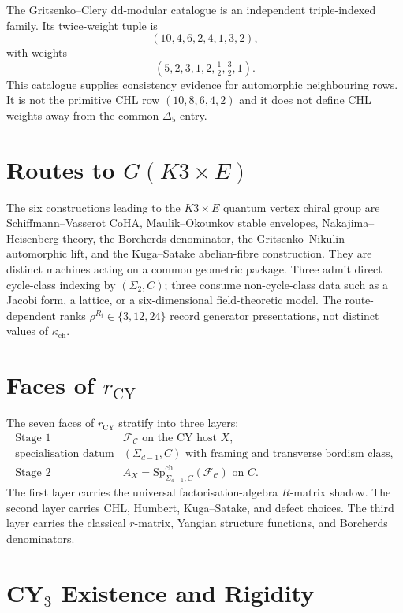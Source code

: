 \documentclass[11pt]{article}
\providecommand{\kch}{\kappa_{\mathrm{ch}}}
\providecommand{\cF}{\mathcal{F}}
\providecommand{\cC}{\mathcal{C}}
\theoremstyle{plain}
\theoremstyle{definition}
\theoremstyle{remark}
\begin{document}
The Gritsenko--Clery dd-modular catalogue is an independent
triple-indexed family.  Its twice-weight tuple is
\[
  (10,4,6,2,4,1,3,2),
\]
with weights
\[
  (5,2,3,1,2,\tfrac12,\tfrac32,1).
\]
This catalogue supplies consistency evidence for automorphic
neighbouring rows.  It is not the primitive CHL row
$(10,8,6,4,2)$ and it does not define CHL weights away from the
common $\Delta_5$ entry.

\section{Routes to \texorpdfstring{$G(K3\times E)$}{G(K3xE)}}

The six constructions leading to the $K3\times E$ quantum vertex
chiral group are Schiffmann--Vasserot CoHA, Maulik--Okounkov stable
envelopes, Nakajima--Heisenberg theory, the Borcherds denominator,
the Gritsenko--Nikulin automorphic lift, and the Kuga--Satake
abelian-fibre construction.  They are distinct machines acting on a
common geometric package.  Three admit direct cycle-class indexing by
$(\Sigma_2,C)$; three consume non-cycle-class data such as a Jacobi
form, a lattice, or a six-dimensional field-theoretic model.  The
route-dependent ranks $\rho^{R_i}\in\{3,12,24\}$ record generator
presentations, not distinct values of $\kch$.

\section{Faces of \texorpdfstring{$r_{\mathrm{CY}}$}{rCY}}

The seven faces of $r_{\mathrm{CY}}$ stratify into three layers:
\[
\begin{array}{ll}
\text{Stage 1} &
  \cF_{\cC}\text{ on the CY host }X,\\
\text{specialisation datum} &
  (\Sigma_{d-1},C)\text{ with framing and transverse bordism class},\\
\text{Stage 2} &
  A_X=\mathrm{Sp}^{\mathrm{ch}}_{\Sigma_{d-1},C}(\cF_{\cC})
  \text{ on }C.
\end{array}
\]
The first layer carries the universal factorisation-algebra
$R$-matrix shadow.  The second layer carries CHL, Humbert,
Kuga--Satake, and defect choices.  The third layer carries the
classical $r$-matrix, Yangian structure functions, and Borcherds
denominators.

\section{CY\texorpdfstring{$_3$}{3} Existence and Rigidity}
\end{document}
